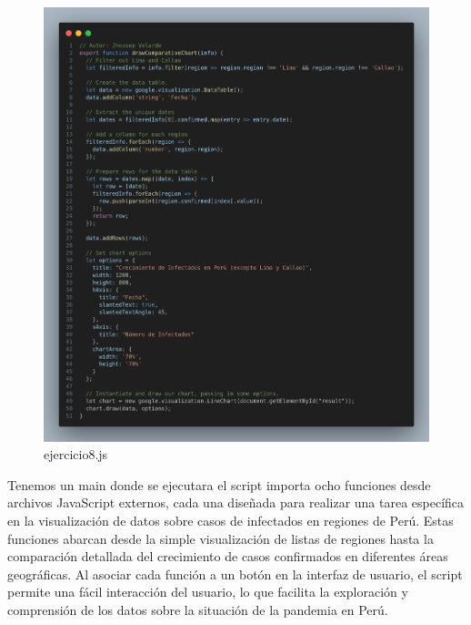\begin{figure}[H]
  \centering
  \includegraphics[width=1.0\textwidth]{img/8_js.png}
  \caption{ejercicio8.js}
\end{figure}
Tenemos un main donde se ejecutara el script importa ocho funciones desde archivos JavaScript externos, cada una diseñada para realizar una tarea específica en la visualización de datos sobre casos de infectados en regiones de Perú. Estas funciones abarcan desde la simple visualización de listas de regiones hasta la comparación detallada del crecimiento de casos confirmados en diferentes áreas geográficas. Al asociar cada función a un botón en la interfaz de usuario, el script permite una fácil interacción del usuario, lo que facilita la exploración y comprensión de los datos sobre la situación de la pandemia en Perú.

